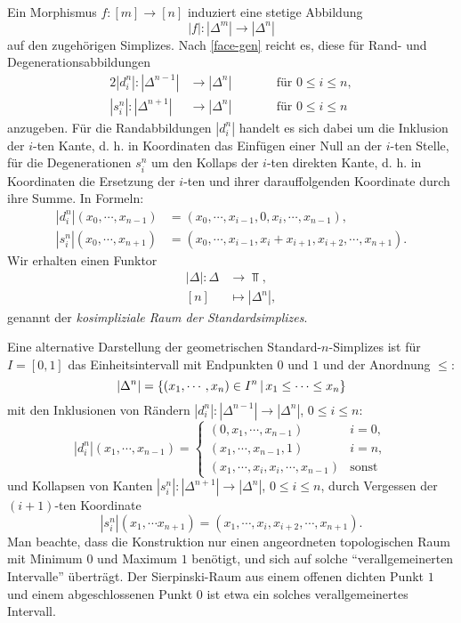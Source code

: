 Ein Morphismus $f: [m] \to [n]$ induziert eine stetige Abbildung
\[ |f|: |\Delta^m| \to |\Delta^n| \]
auf den zugehörigen Simplizes. Nach \ref{face-gen} reicht es, diese
für Rand- und Degenerationsabbildungen
\begin{alignat*}{2}
  |d_i^n|: |\Delta^{n-1}| &\to |\Delta^n| \qquad && \text{für } 0 \leq i \leq n, \\
  |s_i^n|: |\Delta^{n+1}| &\to |\Delta^n| && \text{für } 0 \leq i \leq n
\end{alignat*}
anzugeben. Für die Randabbildungen $|d_i^n|$ handelt es sich dabei um
die Inklusion der $i$-ten Kante, d. h. in Koordinaten das Einfügen
einer Null an der $i$-ten Stelle, für die Degenerationen $s_i^n$ um
den Kollaps der $i$-ten direkten Kante, d. h. in Koordinaten die
Ersetzung der $i$-ten und ihrer darauffolgenden Koordinate durch ihre
Summe. In Formeln:
\begin{align} \label{eq:cosimp-space}
  |d_i^n|(x_0, \cdots, x_{n-1})
  &= (x_0, \cdots, x_{i-1}, 0, x_i, \cdots, x_{n-1}), \\
  |s_i^n|(x_0, \cdots, x_{n+1})
  &= (x_0, \cdots, x_{i-1}, x_i + x_{i+1}, x_{i+2}, \cdots, x_{n+1}).
\end{align}
Wir erhalten einen Funktor
\begin{align*}
  |\Delta|: \Delta &\to \Top, \\
  [n] &\mapsto |\Delta^n|,
\end{align*}
genannt der \emph{kosimpliziale Raum der Standardsimplizes}.

\begin{bem} \label{gen-intervall}
  Eine alternative Darstellung der geometrischen
  Standard-$n$-Simplizes ist für $I = [0, 1]$ das Einheitsintervall
  mit Endpunkten $0$ und $1$ und der Anordnung $\leq$:
  \[ |\Delta^n| = \left\{ (x_1, \cdots, x_n) \in I^n \,\middle|\, x_1 \leq \cdots \leq x_n \right\} \]
  mit den Inklusionen von Rändern $|d_i^n|: |\Delta^{n-1}| \to
  |\Delta^n|$, $0 \leq i \leq n$:
  \[ |d_i^n|(x_1, \cdots, x_{n-1}) = 
  \begin{cases}
    (0, x_1, \cdots, x_{n-1}) & i = 0, \\ (x_1, \cdots, x_{n-1}, 1) &
    i = n, \\ (x_1, \cdots, x_i, x_i, \cdots, x_{n-1}) & \text{sonst}
  \end{cases}
  \]
  und Kollapsen von Kanten $|s_i^n|: |\Delta^{n+1}| \to |\Delta^{n}|$,
  $0 \leq i \leq n$, durch Vergessen der $(i+1)$-ten Koordinate
  \[ |s_i^n|(x_1, \cdots x_{n+1}) =
  (x_1, \cdots, x_i, x_{i+2}, \cdots, x_{n+1}).
  \]
  Man beachte, dass die Konstruktion nur einen angeordneten
  topologischen Raum mit Minimum $0$ und Maximum $1$ benötigt, und
  sich auf solche ``verallgemeinerten Intervalle'' überträgt. Der
  Sierpinski-Raum aus einem offenen dichten Punkt $1$ und einem
  abgeschlossenen Punkt $0$ ist etwa ein solches verallgemeinertes
  Intervall.
\end{bem}

